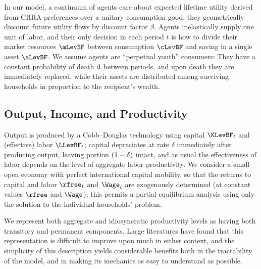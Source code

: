 \documentclass[titlepage]{\econtex}
\begin{document}
In our model, a continuum of agents care about expected lifetime utility derived from CRRA preferences over a unitary consumption good; they geometrically discount future utility flows by discount factor $\beta$.  Agents inelastically supply one unit of labor, and their only decision in each period $t$ is how to divide their market resources $\mLevBF$ between consumption $\cLevBF$ and saving in a single asset $\aLevBF$.  We assume agents are \cite{blanchardFinite} ``perpetual youth'' consumers: They have a constant probability of death $\mathrm{d}$ between periods, and upon death they are immediately replaced, while their assets are distributed among surviving households in proportion to the recipient's wealth.

\subsection{Output, Income, and Productivity}

Output is produced by a Cobb--Douglas technology using capital $\KLevBF_t$ and (effective) labor $\LLevBF_t$; capital depreciates at rate $\delta$ immediately after producing output, leaving portion $(1-\delta)$ intact, and as usual the effectiveness of labor depends on the level of aggregate labor productivity.  We consider a small open economy with perfect international capital mobility, so that the returns to capital and labor $\rfree_t$ and $\Wage_t$ are exogenously determined (at constant values $\rfree$ and $\Wage$); this permits a partial equilibrium analysis using only the solution to the individual households' problem. %

We represent both aggregate and idiosyncratic productivity levels as having both transitory and permanent components.  Large literatures have found that this representation is difficult to improve upon much in either context, and the simplicity of this description yields considerable benefits both in the tractability of the model, and in making its mechanics as easy to understand as possible.
\end{document}
